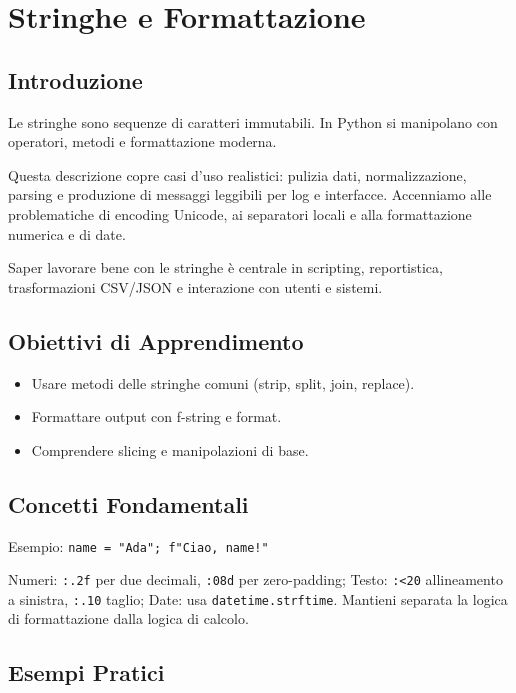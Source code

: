 \chapter{Stringhe e Formattazione}

\section{Introduzione}
Le stringhe sono sequenze di caratteri immutabili. In Python si manipolano con operatori, metodi e formattazione moderna.

Questa descrizione copre casi d'uso realistici: pulizia dati, normalizzazione, parsing e produzione di messaggi leggibili per log e interfacce. Accenniamo alle problematiche di encoding Unicode, ai separatori locali e alla formattazione numerica e di date.

Saper lavorare bene con le stringhe è centrale in scripting, reportistica, trasformazioni CSV/JSON e interazione con utenti e sistemi.

\section{Obiettivi di Apprendimento}
\begin{itemize}
  \item Usare metodi delle stringhe comuni (strip, split, join, replace).
  \item Formattare output con f-string e format.
  \item Comprendere slicing e manipolazioni di base.
\end{itemize}

\section{Concetti Fondamentali}
\begin{tcolorbox}[title=F-string]
Esempio: \texttt{name = "Ada"; f"Ciao, {name}!"}
\end{tcolorbox}
\begin{tcolorbox}[title=Specifiche di formattazione]
Numeri: \texttt{:.2f} per due decimali, \texttt{:08d} per zero-padding; Testo: \texttt{:<20} allineamento a sinistra, \texttt{:.10} taglio; Date: usa \texttt{datetime.strftime}. Mantieni separata la logica di formattazione dalla logica di calcolo.
\end{tcolorbox}

\section{Esempi Pratici}

